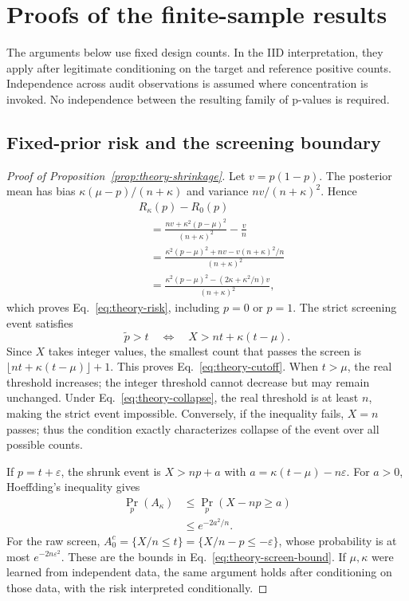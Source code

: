 \section{Proofs of the finite-sample results}\label{app:theory-proofs}

The arguments below use fixed design counts. In the IID interpretation,
they apply after legitimate conditioning on the target and reference
positive counts. Independence across audit observations is assumed where
concentration is invoked. No independence between the resulting family
of p-values is required.

\subsection{Fixed-prior risk and the screening boundary}

\begin{proof}[Proof of Proposition~\ref{prop:theory-shrinkage}]
Let $v=p(1-p)$. The posterior mean has bias
$\kappa(\mu-p)/(n+\kappa)$ and variance $nv/(n+\kappa)^2$. Hence
\begin{align*}
 &R_\kappa(p)-R_0(p)\\
 &\quad=\frac{nv+\kappa^2(p-\mu)^2}{(n+\kappa)^2}-\frac vn\\
 &\quad=\frac{\kappa^2(p-\mu)^2+nv-v(n+\kappa)^2/n}{(n+\kappa)^2}\\
 &\quad=\frac{\kappa^2(p-\mu)^2-(2\kappa+\kappa^2/n)v}
 {(n+\kappa)^2},
\end{align*}
which proves Eq.~\eqref{eq:theory-risk}, including $p=0$ or $p=1$.
The strict screening event satisfies
\[
 \widetilde p>t
 \quad\Longleftrightarrow\quad
 X>nt+\kappa(t-\mu).
\]
Since $X$ takes integer values, the smallest count that passes the screen is
$\lfloor nt+\kappa(t-\mu)\rfloor+1$. This proves
Eq.~\eqref{eq:theory-cutoff}. When $t>\mu$, the real threshold increases;
the integer threshold cannot decrease but may remain unchanged. Under
Eq.~\eqref{eq:theory-collapse}, the real threshold is at least $n$, making
the strict event impossible. Conversely, if the inequality fails, $X=n$
passes; thus the condition exactly characterizes collapse of the event
over all possible counts.

If $p=t+\varepsilon$, the shrunk event is $X>np+a$ with
$a=\kappa(t-\mu)-n\varepsilon$. For $a>0$, Hoeffding's inequality gives
\[
 \begin{aligned}
 \Pr_p(A_\kappa)&\le\Pr_p(X-np\ge a)\\
 &\le e^{-2a^2/n}.
 \end{aligned}
\]
For the raw screen,
$A_0^c=\{X/n\le t\}=\{X/n-p\le-\varepsilon\}$, whose probability is at
most $e^{-2n\varepsilon^2}$. These are the bounds in
Eq.~\eqref{eq:theory-screen-bound}. If $\mu,\kappa$ were learned from
independent data, the same argument holds after conditioning on those
data, with the risk interpreted conditionally.
\end{proof}

